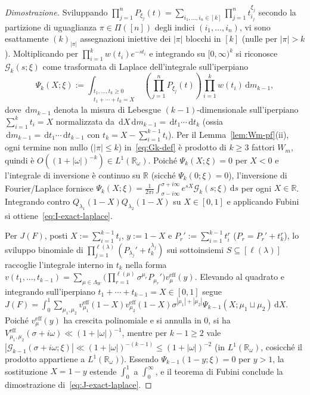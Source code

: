 \documentclass[11pt, reqno]{amsart}
\theoremstyle{remark}
\numberwithin{equation}{section}
\newcommand{\R}{\mathbb{R}}
\newcommand{\cG}{\mathcal{G}}
\newcommand{\dd}{\,\mathrm{d}}
\begin{document}
\begin{proof}[Dimostrazione]
Sviluppando $\prod_{j=1}^n P_{\xi_j}(t) = \sum_{i_1,\dots,i_n \in [k]} \prod_{j=1}^n t_{i_j}^{\xi_j}$
secondo la partizione di uguaglianza $\pi \in \Pi([n])$ degli indici $(i_1,\dots,i_n)$, vi sono esattamente
$(k)_{|\pi|}$ assegnazioni iniettive dei $|\pi|$ blocchi in $[k]$ (nulle per $|\pi| > k$).
Moltiplicando per $\prod_{i=1}^k w(t_i) e^{-s t_i}$ e integrando su $[0,\infty)^k$ si riconosce $\cG_k(s; \xi)$
come trasformata di Laplace dell'integrale sull'iperpiano
\[
\Psi_k(X; \xi) := \int_{\substack{t_1,\dots,t_k \ge 0 \\ t_1+\cdots+t_k = X}}
\left(\prod_{j=1}^n P_{\xi_j}(t)\right) \prod_{i=1}^k w(t_i)\dd m_{k-1},
\]
dove $\dd m_{k-1}$ denota la misura di Lebesgue $(k-1)$-dimensionale sull'iperpiano
$\sum_{i=1}^k t_i = X$ normalizzata da $\dd X \dd m_{k-1} = \dd t_1\cdots\dd t_k$
(ossia $\dd m_{k-1} = \dd t_1\cdots\dd t_{k-1}$ con $t_k = X - \sum_{i=1}^{k-1} t_i$).
Per il Lemma~\ref{lem:Wm-pf}(ii), ogni termine non nullo ($|\pi| \le k$) in~\eqref{eq:Gk-def} è
prodotto di $k \ge 3$ fattori $W_m$, quindi è $O((1+|\omega|)^{-k}) \in L^1(\R_\omega)$. Poiché $\Psi_k(X;\xi) = 0$
per $X < 0$ e l'integrale di inversione è continuo su $\R$ (sicché $\Psi_k(0;\xi) = 0$), l'inversione di
Fourier/Laplace fornisce $\Psi_k(X;\xi) = \frac{1}{2\pi i}\int_{\sigma-i\infty}^{\sigma+i\infty} e^{sX}\cG_k(s;\xi)\dd s$
per ogni $X \in \R$. Integrando contro $Q_{\lambda_1}(1-X) Q_{\lambda_2}(1-X)$ su $X \in [0,1]$ e applicando
Fubini si ottiene~\eqref{eq:I-exact-laplace}.

Per $J(F)$, posti $X := \sum_{i=1}^{k-1} t_i$, $y := 1 - X$ e $P_r' := \sum_{i=1}^{k-1} t_i^r$
($P_r = P_r' + t_k^r$), lo sviluppo binomiale di $\prod_{j=1}^{\ell(\lambda)} (P_{\lambda_j}' + t_k^{\lambda_j})$
sui sottoinsiemi $S \subseteq [\ell(\lambda)]$ raccoglie l'integrale interno in $t_k$ nella forma
$v(t_1,\dots,t_{k-1}) = \sum_{\mu \in \Lambda_W} \bigl(\prod_{r=1}^{\ell(\mu)} \sigma^{\mu_r} P_{\mu_r}'\bigr) v_\mu^{\mathrm{eff}}(y)$.
Elevando al quadrato e integrando sull'iperpiano $t_1 + \cdots + t_{k-1} = X \in [0,1]$ segue
$J(F) = \int_0^1 \sum_{\mu_1,\mu_2} v_{\mu_1}^{\mathrm{eff}}(1-X) v_{\mu_2}^{\mathrm{eff}}(1-X)
\sigma^{|\mu_1|+|\mu_2|} \Psi_{k-1}(X; \mu_1\sqcup\mu_2)\dd X$.
Poiché $v_\mu^{\mathrm{eff}}(y)$ ha crescita polinomiale e si annulla in $0$, si ha
$V_{\mu_1,\mu_2}^{\mathrm{eff}}(\sigma+i\omega) \ll (1+|\omega|)^{-1}$, mentre per $k - 1 \ge 2$ vale
$|\cG_{k-1}(\sigma+i\omega;\xi)| \ll (1+|\omega|)^{-(k-1)} \le (1+|\omega|)^{-2}$ (in $L^1(\R_\omega)$,
cosicché il prodotto appartiene a $L^1(\R_\omega)$).
Essendo $\Psi_{k-1}(1-y;\xi) = 0$ per $y > 1$, la sostituzione $X = 1-y$ estende $\int_0^1$ a $\int_0^\infty$,
e il teorema di Fubini conclude la dimostrazione di~\eqref{eq:J-exact-laplace}.
\end{proof}
\end{document}
